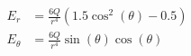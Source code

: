 \documentclass{article}
\begin{document}

\addtocounter{equation}{0}
\begin{align}
    E_r &= \frac{6 Q}{r^{4}} \left(1.5 \cos^{2}{\left (\theta \right )} - 0.5\right) \\
    E_\theta &= \frac{6 Q}{r^{4}} \sin{\left (\theta \right )} \cos{\left (\theta \right )}
\end{align}
\end{document}
